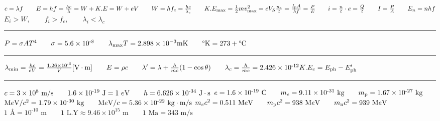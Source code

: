 \documentclass[a4paper,12pt]{article}
\newcommand{\sz}{\text{-}}
\begin{document}
\noindent
$ c = \lambda f \qquad E = hf = \frac{hc}{\lambda} = W + K.E = W + eV \qquad W = h f_c = \frac{hc}{\lambda_c} \qquad K.E_{\text{max}} = \frac{1}{2} m v^2_{\text{max}} = eV_S \qquad \\[+2mm]
\frac{n_\text{e}}{t} = \frac{I_\text{p}A}{hf} = \frac{P}{E} \qquad i = \frac{n}{t} \cdot e = \frac{Q}{t} \qquad I = \frac{P}{A} \qquad E_n = n hf \\[+1mm]$
$E_i > W, \qquad f_i > f_c, \qquad \lambda_i < \lambda_c$

{\centering \rule{15cm}{0.4pt} \par}

\noindent
$P = \sigma AT^4 \qquad \sigma = 5.6 \times 10^{\sz8} \qquad \lambda_{\text{max}} T = 2.898 \times 10^{-3} \text{mK} \qquad \degree \text{K} = 273 + \degree \text{C}$

{\centering \rule{15cm}{0.4pt} \par}

\noindent
$
\lambda_{\text{min}} = \frac{hc}{eV} = \frac{1.26\times10^{\sz6}}{V} [\text{V}\cdot\text{m}] \qquad E = \rho c \qquad \lambda^\prime = \lambda + \frac{h}{mc} (1-\cos{\theta}) \qquad \lambda_c = \frac{h}{mc} = 2.426 \times 10^{\sz12}\\[+1mm]
K.E_e = E_{\text{ph}} - E^\prime_{\text{ph}} \qquad 
$


{\centering \rule{15cm}{0.4pt} \par}

\noindent
$c = 3 \times 10^8 \text{ m}/\text{s} \qquad 1.6\times 10^{\sz 19}\text{ J} = 1 \ e\text{V} \qquad h = 6.626 \times 10^{\sz34} \text{ J} \cdot \text{s}\\[+2mm]$
$e = 1.6 \times 10^{\sz 19} \text{ C} \qquad m_{e} = 9.11 \times 10^{\sz31} \text{ kg} \qquad m_{\text{p}} = 1.67 \times 10^{\sz27} \text{ kg}\\[+2mm]$
$\text{M}e\text{V}/c^2 = 1.79 \times 10^{\sz30} \text{ kg} \qquad \text{M}e\text{V}/c = 5.36 \times 10^{\sz22} \text{ kg}\cdot\text{m}/\text{s}\\[+2mm]$
$m_e c^2 = 0.511 \text{ M}e\text{V} \qquad m_\text{p}c^2 = 938 \text{ M}e\text{V} \qquad m_\text{n}c^2 = 939 \text{ M}e\text{V} \\[+2mm]$
$ 1 \text{ \AA} = 10^{\sz10} \text{ m} \qquad 1 \text{ L.Y} \approx 9.46 \times 10^{15} \text{ m} \qquad 1 \text{ Ma} = 343 \text{ m}/\text{s}$
\end{document}
